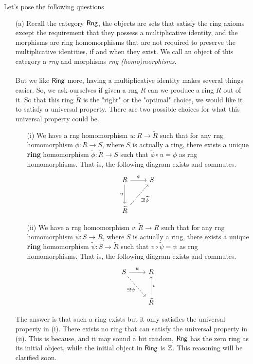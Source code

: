 \vspace*{1em}

\begin{discussion}[Optimisation]\label{adjopt}
Let's pose the following questions
\begin{itemize}
\item[(a)] Recall the category $\mathsf{Rng}$, the objects are sets that satisfy the ring axioms except the requirement that they possess a multiplicative identity, and the morphisms are ring homomorphisms that are not required to preserve the multiplicative identities, if and when they exist. We call an object of this category a \emph{rng} and morphisms \emph{rng (homo)morphisms}.\\
\\
But we like $\mathsf{Ring}$ more, having a multiplicative identity makes several things easier. So, we ask ourselves if given a rng $R$ can we produce a ring $\widetilde{R}$ out of it. So that this ring $\widetilde{R}$ is the "right" or the "optimal" choice, we would like it to satisfy a universal property. There are two possible choices for what this universal property could be. 
\begin{itemize}
\item[(i)] We have a rng homomorphism $u: R \to \widetilde{R}$ such that for any rng homomorphism $\phi:R \to S$, where $S$ is actually a ring, there exists a unique \textbf{ring} homomorphism $\widetilde{\phi}:\widetilde{R} \to S$ such that
$\widetilde{\phi}\circ u = \phi$ as rng homomorphisms. That is, the following diagram exists and commutes.
\[\begin{tikzcd}
R \arrow[r, "\phi"] \arrow[d, "u"']                           & S \\[1em]
\widetilde{R} \arrow[ru, "\exists!\widetilde{\phi}"', dashed] &  
\end{tikzcd}\]
\item[(ii)] We have a rng homomorphism $v: \widetilde{R} \to R$ such that for any rng homomorphism $\psi:S \to R$, where $S$ is actually a ring, there exists a unique \textbf{ring} homomorphism $\widetilde{\psi}:S \to \widetilde{R}$ such that $v\circ\widetilde{\psi} = \psi$ as rng homomorphisms. That is, the following diagram exists and commutes.
\[\begin{tikzcd}
S \arrow[r, "\psi"] \arrow[rd, "\exists!\psi"', dashed] & R \\[1em]
                                                        & \widetilde{R}  \arrow[u, "v"']  
\end{tikzcd}\]
\end{itemize}
The answer is that such a ring exists but it only satisfies the universal property in (i). There exists no ring that can satisfy the universal property in (ii). This is because, and it may sound a bit random, $\mathsf{Rng}$ has the zero ring as its initial object, while the initial object in $\mathsf{Ring}$ is $\mathbb Z$. This reasoning will be clarified soon.


\end{itemize}
\end{discussion}
